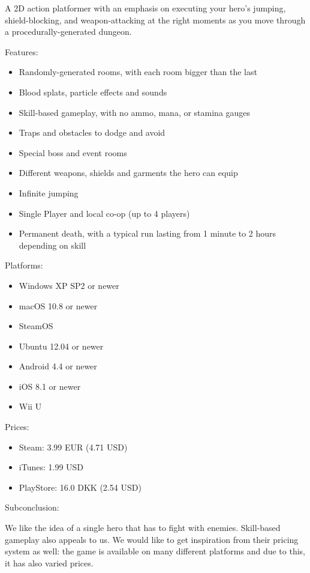 \documentclass[12p]{article}
\begin{document}
A 2D action platformer with an emphasis on executing your hero's jumping, shield-blocking, and weapon-attacking at the right moments as you move through a procedurally-generated dungeon.

Features:

\begin{itemize}
  \item Randomly-generated rooms, with each room bigger than the last
  \item Blood splats, particle effects and sounds
  \item Skill-based gameplay, with no ammo, mana, or stamina gauges
  \item Traps and obstacles to dodge and avoid
  \item Special boss and event rooms
  \item Different weapons, shields and garments the hero can equip
  \item Infinite jumping
  \item Single Player and local co-op (up to 4 players)
  \item Permanent death, with a typical run lasting from 1 minute to 2 hours depending on skill
\end{itemize}

Platforms:

\begin{itemize}
    \item Windows XP SP2 or newer
    \item macOS 10.8 or newer
    \item SteamOS
    \item Ubuntu 12.04 or newer
    \item Android 4.4 or newer
    \item iOS 8.1 or newer
    \item Wii U
\end{itemize}

Prices:

\begin{itemize}
  \item Steam: 3.99 EUR (4.71 USD)
  \item iTunes: 1.99 USD
  \item PlayStore: 16.0 DKK (2.54 USD)
\end{itemize}

Subconclusion:

We like the idea of a single hero that has to fight with enemies. Skill-based gameplay also appeals to us. We would like to get inspiration from their pricing system as well: the game is available on many different platforms and due to this, it has also varied prices.
\end{document}
